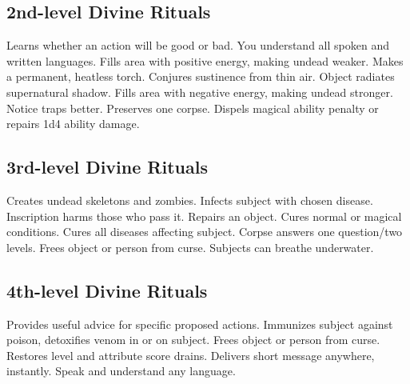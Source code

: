 \subsection{2nd-level Divine Rituals}
\begin{rituallist}
    \M\F Learns whether an action will be good or bad.
     You understand all spoken and written languages.
     Fills area with positive energy, making undead weaker.
     Makes a permanent, heatless torch.
     Conjures sustinence from thin air.
     Object radiates supernatural shadow.
     Fills area with negative energy, making undead stronger.
     Notice traps better.
     Preserves one corpse.
     Dispels magical ability penalty or repairs 1d4 ability damage.
\end{rituallist}

\subsection{3rd-level Divine Rituals}
\begin{rituallist}
     Creates undead skeletons and zombies.
     Infects subject with chosen disease.
    \M Inscription harms those who pass it.
     Repairs an object.
     Cures normal or magical conditions.
     Cures all diseases affecting subject.
     Corpse answers one question/two levels.
     Frees object or person from curse.
     Subjects can breathe underwater.
\end{rituallist}

\subsection{4th-level Divine Rituals}
\begin{rituallist}
     Provides useful advice for specific proposed actions.
     Immunizes subject against poison, detoxifies venom in or on subject.
     Frees object or person from curse.
     Restores level and attribute score drains.
     Delivers short message anywhere, instantly.
     Speak and understand any language.
\end{rituallist}

